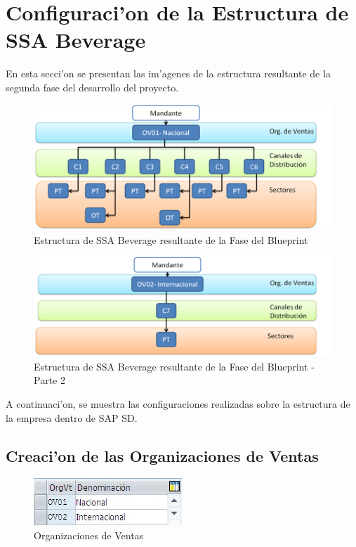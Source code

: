 \section{Configuraci'on de la Estructura de SSA Beverage}
	En esta secci'on se presentan las im'agenes de la estructura resultante de la segunda fase del desarrollo del proyecto.
\begin{figure}[H]
\centering
\includegraphics[scale=0.65,type=png,ext=.png,read=.png]{figures/Org1}
\caption{Estructura de SSA Beverage resultante de la Fase del Blueprint}
\label{fig:estructura1}
\end{figure}
\begin{figure}[H]
\centering
\includegraphics[scale=0.65,type=png,ext=.png,read=.png]{figures/Org2}
\caption{Estructura de SSA Beverage resultante de la Fase del Blueprint - Parte 2}
\label{fig:estructura2}
\end{figure}

	A continuaci'on, se muestra las configuraciones realizadas sobre la estructura de la empresa dentro de SAP SD.
	
	\subsection*{Creaci'on de las Organizaciones de Ventas}
\begin{figure}[H]
\centering
\includegraphics[scale=0.65,type=jpg,ext=.jpg,read=.jpg]{figures/OrgVentas}
\caption{Organizaciones de Ventas}
\label{fig:organizaciones}
\end{figure}


